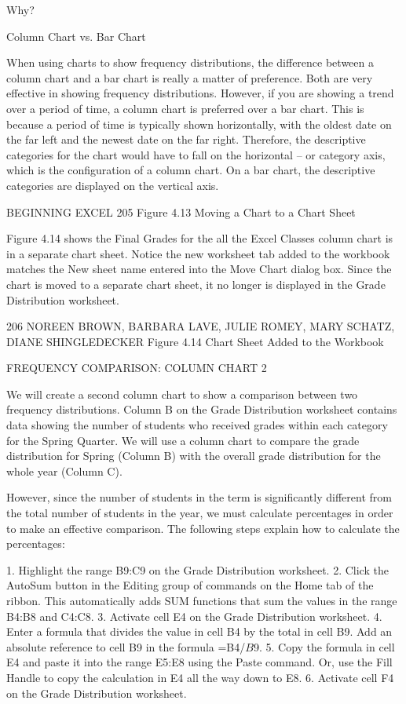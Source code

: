 Why?

Column Chart vs. Bar Chart

When using charts to show frequency distributions, the difference between a column chart and a bar chart is
really a matter of preference. Both are very effective in showing frequency distributions. However, if you are
showing a trend over a period of time, a column chart is preferred over a bar chart. This is because a period of
time is typically shown horizontally, with the oldest date on the far left and the newest date on the far right.
Therefore, the descriptive categories for the chart would have to fall on the horizontal – or category axis, which is
the configuration of a column chart. On a bar chart, the descriptive categories are displayed on the vertical axis.




BEGINNING EXCEL 205
Figure 4.13 Moving a Chart to a Chart Sheet


Figure 4.14 shows the Final Grades for the all the Excel Classes column chart is in a separate chart
sheet. Notice the new worksheet tab added to the workbook matches the New sheet name entered
into the Move Chart dialog box. Since the chart is moved to a separate chart sheet, it no longer is
displayed in the Grade Distribution worksheet.




206 NOREEN BROWN, BARBARA LAVE, JULIE ROMEY, MARY SCHATZ, DIANE SHINGLEDECKER
Figure 4.14 Chart Sheet Added to the Workbook


FREQUENCY COMPARISON: COLUMN CHART 2

We will create a second column chart to show a comparison between two frequency distributions.
Column B on the Grade Distribution worksheet contains data showing the number of students who
received grades within each category for the Spring Quarter. We will use a column chart to compare
the grade distribution for Spring (Column B) with the overall grade distribution for the whole year
(Column C).

However, since the number of students in the term is significantly different from the total number
of students in the year, we must calculate percentages in order to make an effective comparison. The
following steps explain how to calculate the percentages:

1. Highlight the range B9:C9 on the Grade Distribution worksheet.
2. Click the AutoSum button in the Editing group of commands on the Home tab of the ribbon.
This automatically adds SUM functions that sum the values in the range B4:B8 and C4:C8.
3. Activate cell E4 on the Grade Distribution worksheet.
4. Enter a formula that divides the value in cell B4 by the total in cell B9. Add an absolute reference
to cell B9 in the formula =B4/$B$9.
5. Copy the formula in cell E4 and paste it into the range E5:E8 using the Paste command.
Or, use the Fill Handle to copy the calculation in E4 all the way down to E8.
6. Activate cell F4 on the Grade Distribution worksheet.

